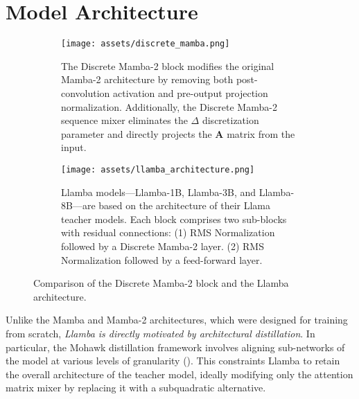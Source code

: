 \section{Model Architecture}
\label{model_architecture}

\begin{figure}[t!]
    \centering
    \begin{subfigure}[b]{0.4\linewidth}
        \centering
        \texttt{[image: assets/discrete\_mamba.png]}
        \caption{
        The Discrete Mamba-2 block \cite{mohawk} modifies the original Mamba-2 architecture by removing both post-convolution activation and pre-output projection normalization. Additionally, the Discrete Mamba-2 sequence mixer eliminates the $\Delta$ discretization parameter and directly projects the $\mathbf{A}$ matrix from the input.
        }
        \label{fig:discrete_mamba}
    \end{subfigure}
    \hspace{0.1\linewidth} %
    \begin{subfigure}[b]{0.4\linewidth}
        \centering
        \texttt{[image: assets/llamba\_architecture.png]}
        \caption{Llamba models—Llamba-1B, Llamba-3B, and Llamba-8B—are based on the architecture of their Llama teacher models. Each block comprises two sub-blocks with residual connections:
        (1) RMS Normalization followed by a Discrete Mamba-2 layer.
        (2) RMS Normalization followed by a feed-forward layer.
        }
        \label{fig:llamba_architecture}
    \end{subfigure}
    \caption{Comparison of the Discrete Mamba-2 block and the Llamba architecture.}
    \label{fig:comparison}
\end{figure}

Unlike the Mamba and Mamba-2 architectures, which were designed for training from scratch, \textit{Llamba is directly motivated by architectural distillation}.
In particular, the Mohawk distillation framework involves aligning sub-networks of the model at various levels of granularity (). 
This constraints Llamba to retain the overall architecture of the teacher model, ideally modifying only the attention matrix mixer by replacing it with a subquadratic alternative.


